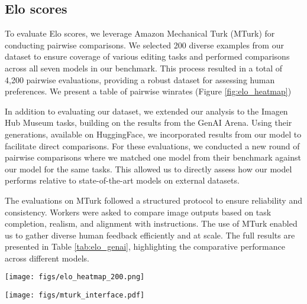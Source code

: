 \subsection{Elo scores}

To evaluate Elo scores, we leverage Amazon Mechanical Turk (MTurk) for conducting pairwise comparisons. We selected 200 diverse examples from our dataset to ensure coverage of various editing tasks and performed comparisons across all seven models in our benchmark. This process resulted in a total of 4,200 pairwise evaluations, providing a robust dataset for assessing human preferences. We present a table of pairwise winrates (Figure \ref{fig:elo_heatmap})  

In addition to evaluating our dataset, we extended our analysis to the Imagen Hub Museum\cite{ku2024imagenhub} tasks, building on the results from the GenAI Arena\cite{jiang2024genai}. Using their generations, available on HuggingFace, we incorporated results from our model to facilitate direct comparisons. For these evaluations, we conducted a new round of pairwise comparisons where we matched one model from their benchmark against our model for the same tasks. This allowed us to directly assess how our model performs relative to state-of-the-art models on external datasets.

The evaluations on MTurk followed a structured protocol to ensure reliability and consistency. Workers were asked to compare image outputs based on task completion, realism, and alignment with instructions. The use of MTurk enabled us to gather diverse human feedback efficiently and at scale. The full results are presented in Table \ref{tab:elo_genai}, highlighting the comparative performance across different models.



\begin{figure*}
    \centering
    \texttt{[image: figs/elo\_heatmap\_200.png]}
    \caption{\textbf{Heatmap of pairwise winrates on our test set.} We excluded draws for this heatmap. }
    \label{fig:elo_heatmap}
\end{figure*}


\begin{figure*}
    \centering
    \texttt{[image: figs/mturk\_interface.pdf]}
    \caption{\textbf{Interface for Elo evaluation on MTurk}. To complete Elo evaluations, we hired workers on Amazon Mechanical Turk to compare the quality of different editing models.}
    \label{fig:mturk_interface}
\end{figure*}

